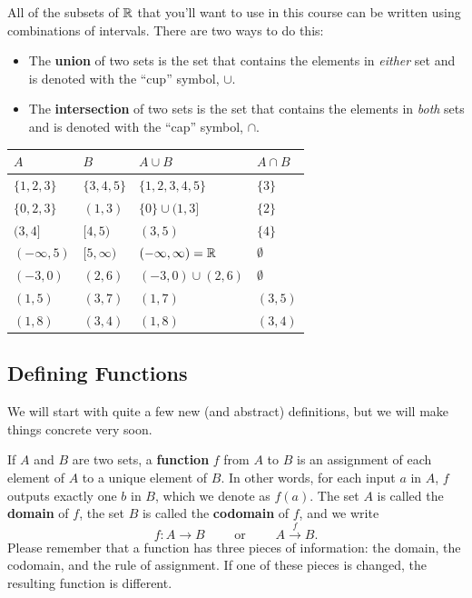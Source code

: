 All of the subsets of $\mathbb{R}$ that you'll want to use in this course can be written using combinations of intervals. There are two ways to do this:
\begin{itemize}
\item The \textbf{union} of two sets is the set that contains the elements in \textit{either} set and is denoted with the ``cup'' symbol, $\cup$.
\item The \textbf{intersection} of two sets is the set that contains the elements in \textit{both} sets and is denoted with the ``cap'' symbol, $\cap$.
\end{itemize}
\begin{exampleblock}
\begin{center}
\renewcommand{\arraystretch}{1.1}
\begin{tabular}{@{}l l l l @{}}
\toprule[0.4mm]
$A$ & $B$ & $A\cup B$ & $A\cap B$\\
\midrule
$\{1, 2, 3\}$ & $\{3, 4, 5\}$ & $\{1,2,3,4,5\}$ & $\{3\}$ \\
$\{0, 2, 3\}$ & $(1,3)$ & $\{0\}\cup(1,3]$ & $\{2\}$\\
$(3,4]$ & $[4,5)$ & $(3,5)$ & $\{4\}$ \\
$(-\infty,5)$ & $[5,\infty)$ & $(-\infty,\infty)=\mathbb{R}$ & $\emptyset$ \\
$(-3,0)$ & $(2,6)$ & $(-3,0) \cup (2,6)$ & $\emptyset$ \\
$(1,5)$ & $(3, 7)$ & $(1,7)$ & $(3,5)$ \\
$(1,8)$ & $(3, 4)$ & $(1,8)$ & $(3,4)$ \\
\bottomrule
\end{tabular}
\end{center}
\end{exampleblock}

\subsection{Defining Functions}

We will start with quite a few new (and abstract) definitions, but we will make things concrete very soon.

If $A$ and $B$ are two sets, a \textbf{function} $f$ from $A$ to $B$ is an assignment of each element of $A$ to a unique element of $B$. In other words, for each input $a$ in $A$, $f$ outputs exactly one $b$ in $B$, which we denote as $f(a)$. The set $A$ is called the \textbf{domain} of $f$, the set $B$ is called the \textbf{codomain} of $f$, and we write $$f:A\to B\quad\quad\text{ or }\quad\quad A\overset{f}{\to} B.$$
Please remember that a function has three pieces of information: the domain, the codomain, and the rule of assignment. If one of these pieces is changed, the resulting function is different. 

